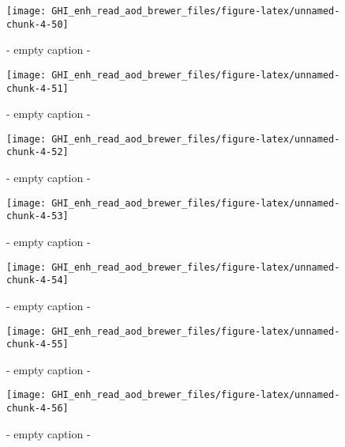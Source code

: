 \documentclass[
  10pt,
  a4paper,oneside]{article}
\begin{document}
\begin{figure}[H]

{\centering \texttt{[image: GHI\_enh\_read\_aod\_brewer\_files/figure-latex/unnamed-chunk-4-50]} 

}

\caption{ - empty caption - }\label{fig:unnamed-chunk-4-50}
\end{figure}
\begin{figure}[H]

{\centering \texttt{[image: GHI\_enh\_read\_aod\_brewer\_files/figure-latex/unnamed-chunk-4-51]} 

}

\caption{ - empty caption - }\label{fig:unnamed-chunk-4-51}
\end{figure}
\begin{figure}[H]

{\centering \texttt{[image: GHI\_enh\_read\_aod\_brewer\_files/figure-latex/unnamed-chunk-4-52]} 

}

\caption{ - empty caption - }\label{fig:unnamed-chunk-4-52}
\end{figure}
\begin{figure}[H]

{\centering \texttt{[image: GHI\_enh\_read\_aod\_brewer\_files/figure-latex/unnamed-chunk-4-53]} 

}

\caption{ - empty caption - }\label{fig:unnamed-chunk-4-53}
\end{figure}
\begin{figure}[H]

{\centering \texttt{[image: GHI\_enh\_read\_aod\_brewer\_files/figure-latex/unnamed-chunk-4-54]} 

}

\caption{ - empty caption - }\label{fig:unnamed-chunk-4-54}
\end{figure}
\begin{figure}[H]

{\centering \texttt{[image: GHI\_enh\_read\_aod\_brewer\_files/figure-latex/unnamed-chunk-4-55]} 

}

\caption{ - empty caption - }\label{fig:unnamed-chunk-4-55}
\end{figure}
\begin{figure}[H]

{\centering \texttt{[image: GHI\_enh\_read\_aod\_brewer\_files/figure-latex/unnamed-chunk-4-56]} 

}

\caption{ - empty caption - }\label{fig:unnamed-chunk-4-56}
\end{figure}
\end{document}
